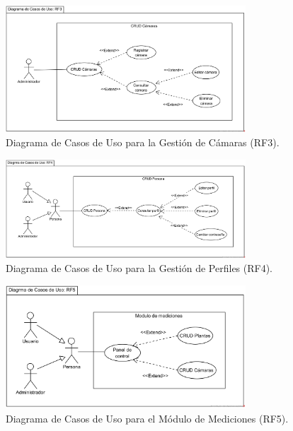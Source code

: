 \begin{figure}[H]
    \centering
    \caption{Diagrama de Casos de Uso para la Gestión de Cámaras (RF3).}
    \label{fig:casos-uso-camaras}
     \includegraphics[width=0.8\textwidth]{UML/CasosUso/Diagrama de Casos de Uso RF3.png}
\end{figure}


\begin{figure}[H]
    \centering
    \caption{Diagrama de Casos de Uso para la Gestión de Perfiles (RF4).}
    \label{fig:casos-uso-perfiles}
    \includegraphics[width=0.8\textwidth]{UML/CasosUso/Diagrama de Casos de Uso RF4.png}
\end{figure}


\begin{figure}[H]
    \centering
    \caption{Diagrama de Casos de Uso para el Módulo de Mediciones (RF5).}
    \label{fig:casos-uso-mediciones}
    \includegraphics[width=0.8\textwidth]{UML/CasosUso/Diagrama de Casos de Uso RF5.png}
\end{figure}


